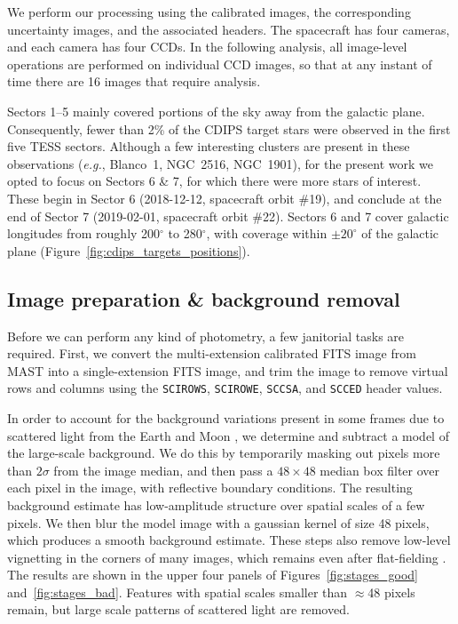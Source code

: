 \documentclass[12pt,twocolumn,tighten]{aastex62}
\begin{document}
We perform our processing using the calibrated images, the
corresponding uncertainty images, and the associated headers.  The
spacecraft has four cameras, and each camera has four CCDs.  In the
following analysis, all image-level operations are performed on
individual CCD images, so that at any instant of time there are 16
images that require analysis.

Sectors 1--5 mainly covered portions of the sky away from
the galactic plane.  Consequently, fewer than 2\% of the CDIPS target stars
were observed in the first five TESS sectors.  Although a few
interesting clusters are present in these observations ({\it e.g.},
Blanco~1, NGC~2516, NGC~1901), for the present work we opted to focus
on Sectors 6 \& 7, for which there were more stars of interest.
These begin in Sector 6 (2018-12-12, spacecraft orbit \#19),
and conclude at the end of Sector 7
(2019-02-01, spacecraft orbit \#22).
Sectors 6 and 7 cover galactic longitudes from roughly 200$^\circ$ to 280$^\circ$, 
with coverage within $\pm 20^\circ$ of the galactic plane
(Figure~\ref{fig:cdips_targets_positions}).


\subsection{Image preparation \& background removal}
\label{subsec:preparation}

Before we can perform any kind of photometry, a few janitorial tasks
are required.
First, we convert the multi-extension calibrated FITS image from MAST
into a single-extension FITS image, and trim the image to remove virtual rows
and columns using the \texttt{SCIROWS}, \texttt{SCIROWE},
\texttt{SCCSA}, and \texttt{SCCED} header values.

In order to account for the background variations present in
some frames due to scattered light from the Earth and Moon
\citep[see][\S 7.3.1--7.3.4]{vanderspek_2018}, we determine and
subtract a model of the large-scale background.  We do this by temporarily
masking out pixels more than $2\sigma$ from the image median, and then
pass a $48\times48$ median box filter over each pixel in the image,
with reflective boundary conditions.  The resulting background
estimate has low-amplitude structure over spatial scales of a few
pixels. We then blur the model image with a gaussian kernel of size 48 pixels,
which produces a smooth
background estimate.  These steps also remove
low-level vignetting in the corners of many images, which
remains even after flat-fielding \citep[see][\S
7.3.5]{vanderspek_2018}.  
The results are shown in the upper four panels of Figures~\ref{fig:stages_good}
and~\ref{fig:stages_bad}.
Features with spatial scales smaller than $\approx$48 pixels remain, 
but large scale patterns of scattered light are removed.
\end{document}
